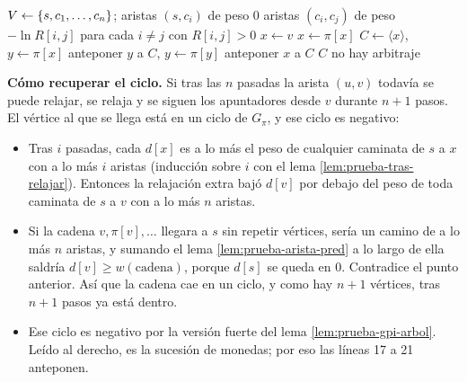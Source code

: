 \documentclass[11pt,letterpaper]{article}
\begin{document}
\begin{algorithm}[H]
\caption{\textsc{Arbitraje}$(R, n)$}
\label{alg:caminos-arbitraje}
\begin{algorithmic}[1]
  \State $V \gets \left\{ s, c_1, \dots, c_n \right\}$; aristas $(s, c_i)$ de
         peso $0$
  \State aristas $(c_i, c_j)$ de peso $-\ln R[i, j]$ para cada
         $i \ne j$ con $R[i, j] > 0$
  \State {}
   
      \State {}
    \EndFor
  \EndFor
      \State {}
      \State $x \gets v$
        \State $x \gets \pi[x]$ 
      \EndFor
      \State $C \gets \langle x \rangle$, \quad $y \gets \pi[x]$
        \State anteponer $y$ a $C$, \quad $y \gets \pi[y]$
      \EndWhile
      \State anteponer $x$ a $C$
      \State \Return $C$ 
    \EndIf
  \EndFor
  \State \Return no hay arbitraje
\EndProcedure
\end{algorithmic}
\end{algorithm}

\textbf{Cómo recuperar el ciclo.} Si tras las $n$ pasadas la arista
$(u, v)$ todavía se puede relajar, se relaja y se siguen los
apuntadores desde $v$ durante $n + 1$ pasos. El vértice al que se
llega está en un ciclo de $G_\pi$, y ese ciclo es negativo:
\begin{itemize}
  \item Tras $i$ pasadas, cada $d[x]$ es a lo más el peso de cualquier
    caminata de $s$ a $x$ con a lo más $i$ aristas (inducción sobre
    $i$ con el lema \ref{lem:prueba-tras-relajar}). Entonces la
    relajación extra bajó $d[v]$ por debajo del peso de toda caminata
    de $s$ a $v$ con a lo más $n$ aristas.
  \item Si la cadena $v, \pi[v], \dots$ llegara a $s$ sin repetir
    vértices, sería un camino de a lo más $n$ aristas, y sumando el
    lema \ref{lem:prueba-arista-pred} a lo largo de ella saldría
    $d[v] \ge w(\text{cadena})$, porque $d[s]$ se queda en $0$.
    Contradice el punto anterior. Así que la cadena cae en un ciclo,
    y como hay $n + 1$ vértices, tras $n + 1$ pasos ya está dentro.
  \item Ese ciclo es negativo por la versión fuerte del lema
    \ref{lem:prueba-gpi-arbol}. Leído al derecho, es la sucesión de
    monedas; por eso las líneas 17 a 21 anteponen.
\end{itemize}
\end{document}
